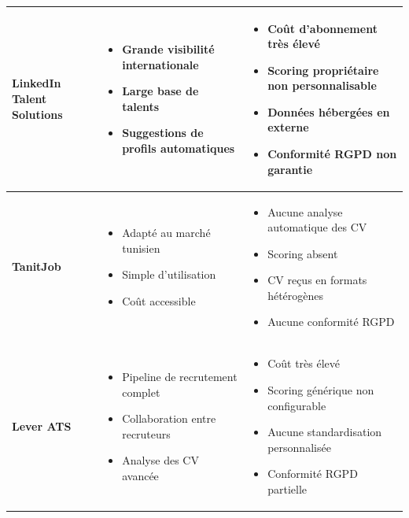 \documentclass[12pt,a4paper,oneside]{report}
\begin{document}
\begin{itemize}
\begin{longtable}{|p{2.2cm}|p{5.1cm}|p{6cm}|}
\textbf{LinkedIn Talent Solutions} &  
\begin{itemize}[leftmargin=*,noitemsep,topsep=0pt,partopsep=0pt,parsep=0pt]
    \item Grande visibilité internationale
    \item Large base de talents
    \item Suggestions de profils automatiques
\end{itemize} &  
\begin{itemize}[leftmargin=*,noitemsep,topsep=0pt,partopsep=0pt,parsep=0pt]
    \item Coût d'abonnement très élevé
    \item Scoring propriétaire non personnalisable
    \item Données hébergées en externe
    \item Conformité RGPD non garantie
\end{itemize} \\
\hline

\textbf{TanitJob} &  
\begin{itemize}[leftmargin=*,noitemsep,topsep=0pt,partopsep=0pt,parsep=0pt]
    \item Adapté au marché tunisien
    \item Simple d'utilisation
    \item Coût accessible
\end{itemize} &  
\begin{itemize}[leftmargin=*,noitemsep,topsep=0pt,partopsep=0pt,parsep=0pt]
    \item Aucune analyse automatique des CV
    \item Scoring absent
    \item CV reçus en formats hétérogènes
    \item Aucune conformité RGPD
\end{itemize} \\
\hline

\textbf{Lever ATS} &  
\begin{itemize}[leftmargin=*,noitemsep,topsep=0pt,partopsep=0pt,parsep=0pt]
    \item Pipeline de recrutement complet
    \item Collaboration entre recruteurs
    \item Analyse des CV avancée
\end{itemize} &  
\begin{itemize}[leftmargin=*,noitemsep,topsep=0pt,partopsep=0pt,parsep=0pt]
    \item Coût très élevé
    \item Scoring générique non configurable
    \item Aucune standardisation personnalisée
    \item Conformité RGPD partielle
\end{itemize} \\
\hline


\end{longtable}
\end{itemize}
\end{document}

